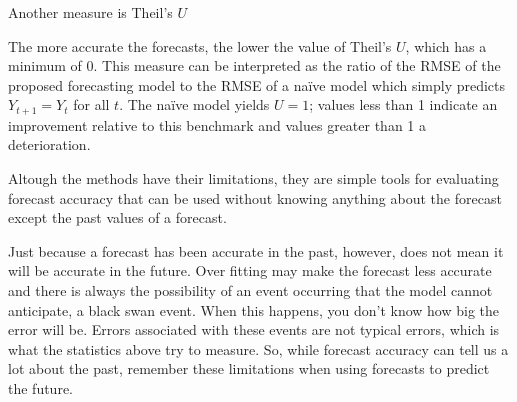 Another measure is Theil's $U$\\
  

The more accurate the forecasts, the lower the value of Theil's $U$,   which has a minimum of 0. This measure can be interpreted as the ratio of the RMSE of the proposed forecasting model to the RMSE of  a na\"ive model which simply predicts $Y_{t+1} = Y_t$ for all $t$. The na\"ive model yields $U = 1$; values less than 1 indicate an  improvement relative to this benchmark and values greater than 1 a deterioration.

Altough the methods have their limitations, they are simple tools for evaluating forecast accuracy that can be used without knowing anything about the forecast except the past values of a forecast.

Just because a forecast has been accurate in the past, however, does not mean it will be accurate in the future. Over fitting may make the forecast less accurate and there is always the possibility of an event occurring that the model cannot anticipate, a black swan event. When this happens, you don’t know how big the error will be. Errors associated with these events are not typical errors, which is what the statistics above try to measure. So, while forecast accuracy can tell us a lot about the past, remember these limitations when using forecasts to predict the future.

\fi